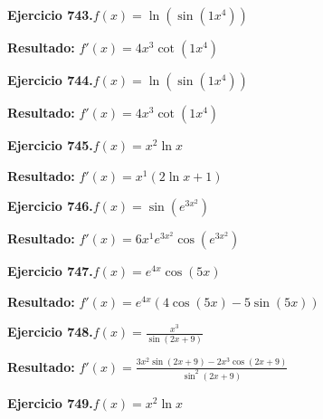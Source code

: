\documentclass[10pt,a4paper]{article}
\begin{document}
\begin{ejbox}
\textbf{Ejercicio 743.}\quad $f(x) = \ln(\sin(1x^{4}))$
\end{ejbox}

\begin{solbox}
\textbf{Resultado:} \(\displaystyle f'(x) = 4x^{3}\cot(1x^{4})\)
\end{solbox}

\begin{ejbox}
\textbf{Ejercicio 744.}\quad $f(x) = \ln(\sin(1x^{4}))$
\end{ejbox}

\begin{solbox}
\textbf{Resultado:} \(\displaystyle f'(x) = 4x^{3}\cot(1x^{4})\)
\end{solbox}

\newpage
\begin{ejbox}
\textbf{Ejercicio 745.}\quad $f(x) = x^{2} \ln x$
\end{ejbox}

\begin{solbox}
\textbf{Resultado:} \(\displaystyle f'(x) = x^{1}(2\ln x + 1)\)
\end{solbox}

\begin{ejbox}
\textbf{Ejercicio 746.}\quad $f(x) = \sin(e^{3x^{2}})$
\end{ejbox}

\begin{solbox}
\textbf{Resultado:} \(\displaystyle f'(x) = 6x^{1}e^{3x^{2}}\cos(e^{3x^{2}})\)
\end{solbox}

\begin{ejbox}
\textbf{Ejercicio 747.}\quad $f(x) = e^{4x} \cos(5x)$
\end{ejbox}

\begin{solbox}
\textbf{Resultado:} \(\displaystyle f'(x) = e^{4x}(4\cos(5x) - 5\sin(5x))\)
\end{solbox}

\newpage
\begin{ejbox}
\textbf{Ejercicio 748.}\quad $f(x) = \frac{x^{3}}{\sin(2x +9)}$
\end{ejbox}

\begin{solbox}
\textbf{Resultado:} \(\displaystyle f'(x) = \frac{3x^{2}\sin(2x +9) - 2x^{3}\cos(2x +9)}{\sin^2(2x +9)}\)
\end{solbox}

\begin{ejbox}
\textbf{Ejercicio 749.}\quad $f(x) = x^{2} \ln x$
\end{ejbox}
\end{document}
